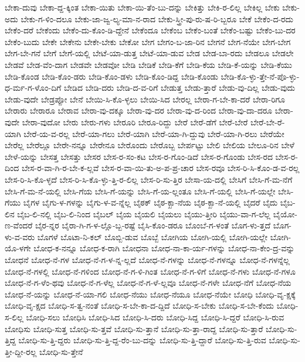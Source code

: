 {ಬೇಕಾ-ದುವು
ಬೇಕಾ-ದ್ದ-ಕ್ಕಿಂತ
ಬೇಕಾ-ಯಿತು
ಬೇಕಾ-ಯಿ-ತೆಂ-ಬು-ದನ್ನು
ಬೇಕಿತ್ತು
ಬೇಕಿ-ರ-ಲಿಲ್ಲ
ಬೇಕಿಲ್ಲ
ಬೇಕು
ಬೇಕು-ಅದು
ಬೇಕು-ಗ-ಳಿಂ-ದಲೂ
ಬೇಕು-ಜಾ-ಜ್ವ-ಲ್ಯ-ಮಾ-ನ-ರಾದ
ಬೇಕು-ಸ್ತ್ರೀ-ಪು-ರು-ಷ-ರಿ-ಬ್ಬರೂ
ಬೇಕೆ
ಬೇಕೆಂ-ದ-ರದು
ಬೇಕೆಂ-ದರೆ
ಬೇಕೆಂದು
ಬೇಕೆಂ-ದು-ಕೊಂ-ಡಿ-ದ್ದೇನೆ
ಬೇಕೆಂದೂ
ಬೇಕೆಂಬ
ಬೇಕೆಂ-ಬಂತೆ
ಬೇಕೆಂ-ಬಷ್ಟು
ಬೇಕೆಂ-ಬು-ದರ
ಬೇಕೆಂ-ಬುದು
ಬೇಕೇ
ಬೇಕೇನು
ಬೇಕೇ-ಬೇಕು
ಬೇಕೋ
ಬೇಗ
ಬೇಗಂ-ಬ-ಜಾ-ರಿನ
ಬೇಗನೆ
ಬೇಗ-ನೆಯೇ
ಬೇಗ-ಬೇಗ
ಬೇಗ-ಬೇ-ಗನೆ
ಬೇಗೆ
ಬೇಗೆ-ಯಲ್ಲಿ
ಬೇಟೆ-ಯಾ-ಡುತ್ತ
ಬೇಟೆ-ಯಾ-ಡುವ
ಬೇಡ
ಬೇಡ-ಬಾ-ರದು
ಬೇಡಲೂ
ಬೇಡಲೇ
ಬೇಡವೆ
ಬೇಡ-ವೆಂ-ದಾಗ
ಬೇಡವೇ
ಬೇಡವೋ
ಬೇಡಿ
ಬೇಡಿಕೆ
ಬೇಡಿ-ಕೆಗೆ
ಬೇಡಿ-ಕೆಯ
ಬೇಡಿ-ಕೆ-ಯನ್ನು
ಬೇಡಿ-ಕೆಯು
ಬೇಡಿ-ಕೊಂಡ
ಬೇಡಿ-ಕೊಂ-ಡರು
ಬೇಡಿ-ಕೊಂ-ಡಳು
ಬೇಡಿ-ಕೊಂ-ಡಿದ್ದ
ಬೇಡಿ-ಕೊಂಡು
ಬೇಡಿ-ಕೊ-ಳ್ಳು-ತ್ತೇ-ನೆ-ಪೊ-ಳ್ಳು-ಧ-ರ್ಮ-ಗ-ಳೊಂ-ದಿಗೆ
ಬೇಡಿದ
ಬೇಡಿ-ದರು
ಬೇಡಿ-ದ-ವ-ರಿಗೆ
ಬೇಡುತ್ತ
ಬೇಡು-ತ್ತಾರೆ
ಬೇಡು-ವು-ದಿಲ್ಲ
ಬೇಡು-ವುದು
ಬೇಡು-ವುದೇ
ಬೇಡ್ರಪ್ಪೋ
ಬೇನೆ
ಬೇಯಿ-ಸಿ-ಕೊ-ಳ್ಳಲು
ಬೇಯಿ-ಸಿದ
ಬೇರಲ್ಲ
ಬೇರಾ-ಗ-ಬೇ-ಕಾ-ದರೆ
ಬೇರಾ-ರಿಗೂ
ಬೇರಾರು
ಬೇರಾರೂ
ಬೇರಾವ
ಬೇರಾ-ವು-ದಕ್ಕೂ
ಬೇರಾ-ವು-ದರ
ಬೇರಾ-ವು-ದ-ರಿಂದ
ಬೇರಾ-ವು-ದಾ-ದರೂ
ಬೇರಾ-ವುದೇ
ಬೇರಾ-ವುದೋ
ಬೇರು
ಬೇರು-ಗಳು
ಬೇರೂರಿ
ಬೇರೂ-ರಿದ್ದು
ಬೇರೆ
ಬೇರೆ-ಡೆಗೆ
ಬೇರೆ-ಬೇರೆ
ಬೇರೆ-ಬೇ-ರೆ-ಯಾಗಿ
ಬೇರೆ-ಯ-ವ-ರಲ್ಲ
ಬೇರೆ-ಯಾ-ಗಲು
ಬೇರೆ-ಯಾಗಿ
ಬೇರೆ-ಯಾ-ಗಿ-ದ್ದುವು
ಬೇರೆ-ಯಾ-ಗಿ-ರಲು
ಬೇರೆಯೇ
ಬೇರೆಲ್ಲ
ಬೇರೆಲ್ಲೂ
ಬೇರೇ-ನನ್ನೂ
ಬೇರೇನೂ
ಬೇರೊಂದು
ಬೇರೊಬ್ಬ
ಬೇರ್ಪಟ್ಟು
ಬೇಲಿ
ಬೇಲಿಯ
ಬೇಲೂ-ರಿನ
ಬೇಳೆ
ಬೇಳೆ-ಯನ್ನು
ಬೇಸತ್ತ
ಬೇಸತ್ತು
ಬೇಸರ
ಬೇಸ-ರ-ಸಂ-ಕಟ
ಬೇಸ-ರ-ಗೊಂ-ಡಿದೆ
ಬೇಸ-ರ-ಗೊಂಡು
ಬೇಸ-ರದ
ಬೇಸ-ರ-ದಿಂದ
ಬೇಸ-ರ-ವಾ-ಗಿ-ರ-ಬೇ-ಕ-ಲ್ಲವೆ
ಬೇಸ-ರ-ವಾ-ಯಿ-ತು-ಅ-ಪ-ಪ್ರ-ಚಾರ
ಬೇಸ-ರವೂ
ಬೇಸ-ರಿ-ಸಿ-ಕೊಂ-ಡ-ವ-ರಲ್ಲ
ಬೇಸ-ರಿ-ಸಿ-ಕೊ-ಳ್ಳದೆ
ಬೇಸ-ರಿ-ಸಿ-ಕೊ-ಳ್ಳು-ತ್ತಿ-ರ-ಲಿಲ್ಲ
ಬೇಸ-ರಿ-ಸು-ತ್ತಿರ
ಬೇಸಾ-ಯ-ದಲ್ಲಿ
ಬೇಸಿಗೆ
ಬೇಸಿ-ಗೆ-ಮ-ನೆಗೆ
ಬೇಸಿ-ಗೆ-ಮ-ನೆ-ಯಲ್ಲಿ
ಬೇಸಿ-ಗೆಯ
ಬೇಸಿ-ಗೆ-ಯನ್ನು
ಬೇಸಿ-ಗೆ-ಯ-ಲ್ಲಂತೂ
ಬೇಸಿ-ಗೆ-ಯಲ್ಲಿ
ಬೇಸಿ-ಗೆ-ಯಲ್ಲೇ
ಬೇಸಿ-ಗೆಯು
ಬೈಗಳ
ಬೈಗು-ಳ-ಗಳನ್ನು
ಬೈಗು-ಳ-ವ-ನ್ನೆಲ್ಲ
ಬೈಠಕ್
ಬೈಠ-ಕ್ಖಾ-ನೆಯ
ಬೈಠ-ಕ್ಖಾ-ನೆ-ಯಲ್ಲಿ
ಬೈದರೆ
ಬೈದು
ಬೈಬ-ಲಿನ
ಬೈಬ-ಲಿ-ನಲ್ಲಿ
ಬೈಬ-ಲಿ-ನಿಂದ
ಬೈಬಲ್
ಬೈಯ
ಬೈಯಲಿ
ಬೈಯಲು
ಬೈಯು-ತ್ತೀರಿ
ಬೈಯು-ವಾ-ಗ-ಲೆಲ್ಲ
ಬೈಯೋ-ಣ-ವೆಂದರೆ
ಬೈರ-ನ್ನರ
ಬೈರಾ-ಗಿ-ಗ-ಳ-ಲ್ಲೊ-ಬ್ಬ-ರಷ್ಟೆ
ಬೈಸಿ-ಕೊಂ-ಡರೂ
ಬೊಂಬೆ-ಗ-ಳಂತೆ
ಬೊಗ-ಳು-ತ್ತದೆ
ಬೊಗ-ಳು-ವ-ವರು
ಬೊಗಳೆ
ಬೊಟಾ-ನಿ-ಕಲ್
ಬೊಬ್ಬಿ-ಡುವ
ಬೊಬ್ಬೆ
ಬೋಗಿಯ
ಬೋಗಿ-ಯಲ್ಲಿ
ಬೋಗಿ-ಯಲ್ಲೇ
ಬೋಗಿ-ಯೊ-ಳಗೇ
ಬೋಧ-ಕ-ನನ್ನೂ
ಬೋಧ-ಕ-ರಾಗಿ
ಬೋಧನಾ
ಬೋಧ-ನಾ-ಕಾ-ರ್ಯ-ಗಳನ್ನು
ಬೋಧ-ನಾ-ಕೇಂ-ದ್ರ-ವನ್ನು
ಬೋಧನೆ
ಬೋಧ-ನೆ-ಗಳ
ಬೋಧ-ನೆ-ಗ-ಳ-ನ್ನ-ಲ್ಲದೆ
ಬೋಧ-ನೆ-ಗಳನ್ನು
ಬೋಧ-ನೆ-ಗಳನ್ನೂ
ಬೋಧ-ನೆ-ಗಳನ್ನೆಲ್ಲ
ಬೋಧ-ನೆ-ಗಳಲ್ಲಿ
ಬೋಧ-ನೆ-ಗಳಿಂದ
ಬೋಧ-ನೆ-ಗ-ಳಿ-ಗಿಂತ
ಬೋಧ-ನೆ-ಗ-ಳಿಗೆ
ಬೋಧ-ನೆ-ಗಳು
ಬೋಧ-ನೆ-ಗಳೂ
ಬೋಧ-ನೆ-ಗ-ಳೆಂ-ಥವು
ಬೋಧ-ನೆ-ಗ-ಳೆಲ್ಲ
ಬೋಧ-ನೆ-ಗ-ಳೆ-ಲ್ಲವೂ
ಬೋಧ-ನೆ-ಗಳೇ
ಬೋಧ-ನೆಗೆ
ಬೋಧ-ನೆಯ
ಬೋಧ-ನೆ-ಯನ್ನು
ಬೋಧ-ನೆ-ಯಾ-ಗಲಿ
ಬೋಧ-ನೆಯು
ಬೋಧ-ನೆಯೂ
ಬೋಧ-ನೆಯೇ
ಬೋಧಿ
ಬೋಧಿ-ವೃ-ಕ್ಷಕ್ಕೆ
ಬೋಧಿ-ವೃ-ಕ್ಷದ
ಬೋಧಿ-ಸ-ತ್ವ-ನಂತೆ
ಬೋಧಿ-ಸ-ಬೇ-ಕಾ-ದ-ದ್ದಿದೆ
ಬೋಧಿ-ಸ-ಬೇಕು
ಬೋಧಿ-ಸ-ಬೇ-ಕೆಂದು
ಬೋಧಿ-ಸ-ಲಿಲ್ಲ
ಬೋಧಿ-ಸಲು
ಬೋಧಿಸಿ
ಬೋಧಿ-ಸಿದ
ಬೋಧಿ-ಸಿ-ದರು
ಬೋಧಿ-ಸಿದ್ದ
ಬೋಧಿ-ಸಿ-ದ್ದರೆ
ಬೋಧಿ-ಸಿ-ರುವ
ಬೋಧಿಸು
ಬೋಧಿ-ಸುತ್ತ
ಬೋಧಿ-ಸು-ತ್ತವೆ
ಬೋಧಿ-ಸು-ತ್ತಾನೆ
ಬೋಧಿ-ಸು-ತ್ತಾ-ರಾದ್ದ
ಬೋಧಿ-ಸು-ತ್ತಾರೆ
ಬೋಧಿ-ಸು-ತ್ತಿದ್ದ
ಬೋಧಿ-ಸು-ತ್ತಿ-ದ್ದರು
ಬೋಧಿ-ಸು-ತ್ತಿ-ದ್ದ-ರೆಂ-ಬು-ದನ್ನು
ಬೋಧಿ-ಸು-ತ್ತಿ-ದ್ದಾರೆ
ಬೋಧಿ-ಸು-ತ್ತಿ-ರುವ
ಬೋಧಿ-ಸು-ತ್ತೀ-ದ್ದೀ-ರಲ್ಲ
ಬೋಧಿ-ಸು-ತ್ತೇನೆ
}
